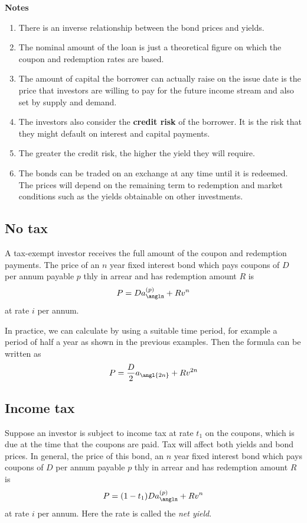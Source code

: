 \documentclass[
]{book}
\theoremstyle{definition}
\theoremstyle{definition}
\theoremstyle{definition}
\theoremstyle{definition}
\theoremstyle{remark}
\begin{document}
\textbf{Notes}

\begin{enumerate}
\def\labelenumi{\arabic{enumi}.}
\item
  There is an inverse relationship between the bond prices and yields.
\item
  The nominal amount of the loan is just a theoretical figure on which
  the coupon and redemption rates are based.
\item
  The amount of capital the borrower can actually raise on the issue
  date is the price that investors are willing to pay for the future
  income stream and also set by supply and demand.
\item
  The investors also consider the \textbf{credit risk} of the borrower. It
  is the risk that they might default on interest and capital
  payments.
\item
  The greater the credit risk, the higher the yield they will require.
\item
  The bonds can be traded on an exchange at any time until it is
  redeemed. The prices will depend on the remaining term to redemption
  and market conditions such as the yields obtainable on other
  investments.
\end{enumerate}

\hypertarget{no-tax}{%
\subsection{No tax}\label{no-tax}}

A tax-exempt investor receives the full amount of the coupon and
redemption payments. The price of an \(n\) year fixed interest bond which
pays coupons of \(D\) per annum payable \(p\) thly in arrear and has
redemption amount \(R\) is \[P = D a_{\angln}^{(p)} + R v^n\] at rate \(i\)
per annum.

In practice, we can calculate by using a suitable time period, for
example a period of half a year as shown in the previous examples. Then
the formula can be written as
\[P = \frac{D}{2} a_{\angl{2n}} + R v^{2n}\]

\hypertarget{income-tax}{%
\subsection{Income tax}\label{income-tax}}

Suppose an investor is subject to income tax at rate \(t_1\) on the
coupons, which is due at the time that the coupons are paid. Tax will
affect both yields and bond prices. In general, the price of this bond,
an \(n\) year fixed interest bond which pays coupons of \(D\) per annum
payable \(p\) thly in arrear and has redemption amount \(R\) is
\[P = (1 - t_1) D a_{\angln}^{(p)} + R v^n\] at rate \(i\) per annum. Here
the rate is called the \emph{net yield}.
\end{document}
